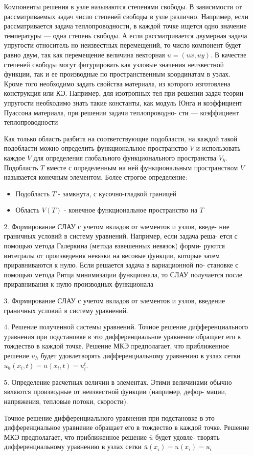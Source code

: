 Компоненты решения в узле называются степенями
свободы. В зависимости от рассматриваемых задач число степеней свободы
в узле различно. Например, если рассматривается задача теплопроводности,
в каждой точке ищется одно значение температуры — одна степень
свободы. А если рассматривается двумерная задача упругости относитель
но неизвестных перемещений, то число компонент будет равно двум, так
как перемещение величина векторная $u = (ux, uy)$. В качестве степеней
свободы могут фигурировать как узловые значения неизвестной функции,
так и ее производные по пространственным координатам в узлах. Кроме 
того необходимо задать свойства материала, из которого изготовлена
конструкция или КЭ. Например, для изотропных тел при решении задач
теории упругости необходимо знать такие константы, как модуль Юнга
и коэффициент Пуассона материала, при решении задачи теплопроводно-
сти — коэффициент теплопроводности

Как только область разбита на соответствующие подобласти, на каждой такой подобласти можно 
определить функциональное пространство $V$ и использовать каждое $V$ для определения глобального
функционального пространства $V_h$. Подобласть $T$ вместе с определенным на ней функциональным пространством $V$ называется конечным элементом. Более строгое определение:

\begin{itemize}
    \item Подобласть $T$ - замкнута, с кусочно-гладкой границей
    \item Область $V(T)$ - конечное функциональное пространство на $T$
\end{itemize}

2. Формирование СЛАУ с учетом вкладов от элементов и узлов, введе-
ние граничных условий в систему уравнений. Например, если задача реша-
ется с помощью метода Галеркина (метода взвешенных невязок) форми-
руются интегралы от произведения невязки на весовые функции, которые
затем приравниваются к нулю. Если решается задача в вариационной по-
становке с помощью метода Ритца минимизации функционала, то СЛАУ
получается после приравнивания к нулю производных функционала

3. Формирование СЛАУ с учетом вкладов от элементов и узлов, введение 
граничных условий в систему уравнений. 

4. Решение полученной системы уравнений.
Точное решение дифференциального уравнения при подстановке в это
дифференциальное уравнение обращает его в тождество в каждой точке.
Решение МКЭ предполагает, что приближенное решение $u_h$ будет удовлетворять
дифференциальному уравнению в узлах сетки $u_h(x_i, t) = u(x_i, t) = u_i^t$.

5. Определение расчетных величин в элементах. Этими величинами
обычно являются производные от неизвестной функции (например, дефор-
мации, напряжения, тепловые потоки, скорости).

Точное решение дифференциального уравнения при подстановке в это
дифференциальное уравнение обращает его в тождество в каждой точке.
Решение МКЭ предполагает, что приближенное решение $\overline{u}$ будет удовле-
творять дифференциальному уравнению в узлах сетки $\overline{u}(x_i) = u(x_i) = u_i$
